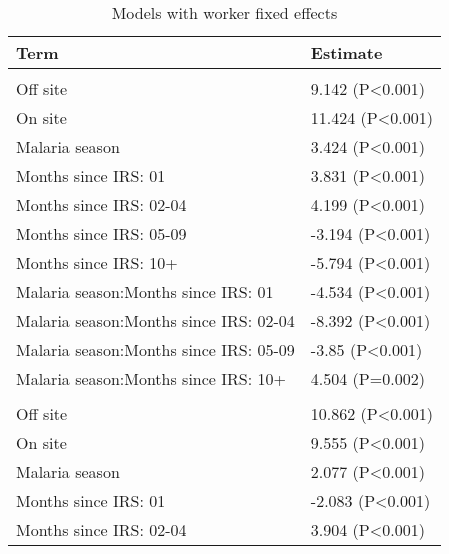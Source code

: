 \documentclass[]{article}
\begin{document}
\begin{table}

\caption{\label{tab:unnamed-chunk-17}Models with worker fixed effects}
\centering
\begin{tabular}[t]{ll}
\toprule
Term & Estimate\\
\midrule
\addlinespace[1.5em]
\multicolumn{2}{l}{\textbf{Permanent field worker}}\\
\hspace{1em}Off site & 9.142 (P<0.001)\\
\hspace{1em}On site & 11.424 (P<0.001)\\
\hspace{1em}Malaria season & 3.424 (P<0.001)\\
\hspace{1em}Months since IRS: 01 & 3.831 (P<0.001)\\
\hspace{1em}Months since IRS: 02-04 & 4.199 (P<0.001)\\
\hspace{1em}Months since IRS: 05-09 & -3.194 (P<0.001)\\
\hspace{1em}Months since IRS: 10+ & -5.794 (P<0.001)\\
\hspace{1em}Malaria season:Months since IRS: 01 & -4.534 (P<0.001)\\
\hspace{1em}Malaria season:Months since IRS: 02-04 & -8.392 (P<0.001)\\
\hspace{1em}Malaria season:Months since IRS: 05-09 & -3.85 (P<0.001)\\
\hspace{1em}Malaria season:Months since IRS: 10+ & 4.504 (P=0.002)\\
\addlinespace[1.5em]
\multicolumn{2}{l}{\textbf{Permanent not field worker}}\\
\hspace{1em}Off site & 10.862 (P<0.001)\\
\hspace{1em}On site & 9.555 (P<0.001)\\
\hspace{1em}Malaria season & 2.077 (P<0.001)\\
\hspace{1em}Months since IRS: 01 & -2.083 (P<0.001)\\
\hspace{1em}Months since IRS: 02-04 & 3.904 (P<0.001)\\

\end{tabular}
\end{table}
\end{document}
